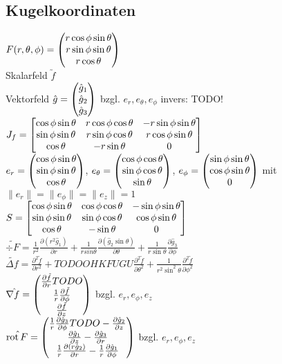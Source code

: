 \documentclass[german]{latex4ei/latex4ei_sheet}
\begin{document}
\subsection{Kugelkoordinaten}
$F(r,\theta,\phi)=\begin{pmatrix} r \cos \phi \sin \theta\\ r \sin \phi \sin \theta\\ r \cos \theta \end{pmatrix}$\\
Skalarfeld $\utilde{f}$\\
Vektorfeld $\hat{g}=\begin{pmatrix} \hat{g}_1\\\hat{g}_2\\\hat{g}_3 \end{pmatrix}$ bzgl. $e_r,e_\theta,e_\phi$
invers: TODO!\\
$J_f=\mat{\cos \phi \sin \theta & r \cos \phi \cos \theta & -r \sin \phi \sin \theta  \\
\sin\phi\sin\theta & r \sin \phi \cos \theta & r \cos \phi \sin \theta \\ \cos \theta & - r \sin \theta & 0}$\\
$e_r=\begin{pmatrix} \cos \phi \sin \theta \\ \sin \phi \sin \theta\\ \cos \theta \end{pmatrix}$, $e_\theta=\begin{pmatrix} \cos \phi \cos \theta \\ \sin \phi \cos \theta \\ \sin \theta \end{pmatrix}$, $e_\phi=\begin{pmatrix} \sin \phi \sin \theta \\ \cos \phi \sin \theta \\ 0 \end{pmatrix}$ mit $\|e_r\|=\|e_\phi\|=\|e_z\|=1$\\
$S=\mat{\cos \phi \sin \theta &  \cos \phi \cos \theta & - \sin \phi \sin \theta  \\
\sin\phi\sin\theta &  \sin \phi \cos \theta &  \cos \phi \sin \theta \\ \cos \theta & -  \sin \theta & 0}$\\
$\tilde{\div F}=\frac{1}{r^2}\frac{\partial (r^2 \hat{g}_1)}{\partial r}+ \frac{1}{r sin \theta}\frac{\partial (\hat{g}_2 \sin \theta)}{\partial \theta}+\frac{1}{r \sin \theta}\frac{\partial \hat{g}_3}{\partial \phi}$ \\
$\tilde{\Delta f}=\frac{\partial^2 \tilde{f}}{\partial r^2}+TODOO HKFUGU\frac{\partial^2 \tilde{f}}{\partial \theta^2}+\frac{1}{r^2 \sin^2 \theta}\frac{\partial^2 \tilde{f}}{\partial \phi^2}$ \\
$\hat{\nabla f}=\begin{pmatrix} \frac{\partial \tilde{f}}{\partial r	}TODO\\\frac{1}{r}\frac{\partial \tilde{f}}{\partial \phi}\\\frac{\partial \tilde{f}}{\partial z} \end{pmatrix}$ bzgl. $e_r,e_\phi,e_z$\\
$\hat{\operatorname{rot} F}=\begin{pmatrix} \frac{1}{r}\frac{\partial \hat{g}_3}{\partial \phi}TODO - \frac{\partial \hat{g}_2}{\partial z}\\\frac{\partial \hat{g}_1}{\partial z} - \frac{\partial \hat{g}_3}{\partial r}\\\frac{1}{r}\frac{\partial (r \hat{g}_2)}{\partial r} - \frac{1}{r}\frac{\partial \hat{g}_1}{\partial \phi} \end{pmatrix}$ bzgl. $e_r,e_\phi,e_z$\\
\end{document}
